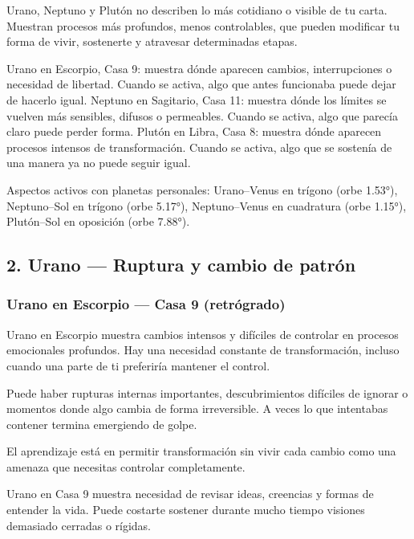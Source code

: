\documentclass[11pt,a4paper]{article}
\begin{document}
Urano, Neptuno y Plutón no describen lo más cotidiano o visible de tu carta. Muestran procesos más profundos, menos controlables, que pueden modificar tu forma de vivir, sostenerte y atravesar determinadas etapas.

Urano en Escorpio, Casa 9: muestra dónde aparecen cambios, interrupciones o necesidad de libertad. Cuando se activa, algo que antes funcionaba puede dejar de hacerlo igual.
Neptuno en Sagitario, Casa 11: muestra dónde los límites se vuelven más sensibles, difusos o permeables. Cuando se activa, algo que parecía claro puede perder forma.
Plutón en Libra, Casa 8: muestra dónde aparecen procesos intensos de transformación. Cuando se activa, algo que se sostenía de una manera ya no puede seguir igual.

Aspectos activos con planetas personales: Urano–Venus en trígono (orbe 1.53°), Neptuno–Sol en trígono (orbe 5.17°), Neptuno–Venus en cuadratura (orbe 1.15°), Plutón–Sol en oposición (orbe 7.88°).

\vspace{0.8cm}


\subsection{2. Urano — Ruptura y cambio de patrón}

\subsubsection*{Urano en Escorpio — Casa 9 (retrógrado)}

Urano en Escorpio muestra cambios intensos y difíciles de controlar en procesos emocionales profundos. Hay una necesidad constante de transformación, incluso cuando una parte de ti preferiría mantener el control.

Puede haber rupturas internas importantes, descubrimientos difíciles de ignorar o momentos donde algo cambia de forma irreversible. A veces lo que intentabas contener termina emergiendo de golpe.

El aprendizaje está en permitir transformación sin vivir cada cambio como una amenaza que necesitas controlar completamente.

Urano en Casa 9 muestra necesidad de revisar ideas, creencias y formas de entender la vida. Puede costarte sostener durante mucho tiempo visiones demasiado cerradas o rígidas.
\end{document}
